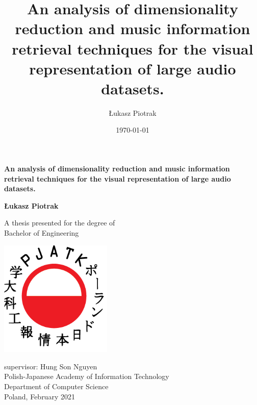 \documentclass[11pt]{article}
\author{Łukasz Piotrak}
\date{\today}
\title{An analysis of dimensionality reduction and music information retrieval techniques for the visual representation of large audio datasets.}
\begin{document}
\begin{titlepage}
        \vspace*{1cm}

        \Large
        \textbf{An analysis of dimensionality reduction and music information retrieval techniques for the visual representation of large audio datasets.}

    \begin{center}
        \vspace{1.5cm}

        \textbf{Łukasz Piotrak} \\

        \vfill

        A thesis presented for the degree of \\ Bachelor of Engineering

        \vspace{0.8cm}

        \includegraphics[width=0.4\textwidth]{./Figures/PJATKLogo.png}

        \Large
        supervisor: Hung Son Nguyen \\
        Polish-Japanese Academy of Information Technology \\
        Department of Computer Science \\
        Poland, February 2021

    \end{center}
\end{titlepage}
\end{document}
